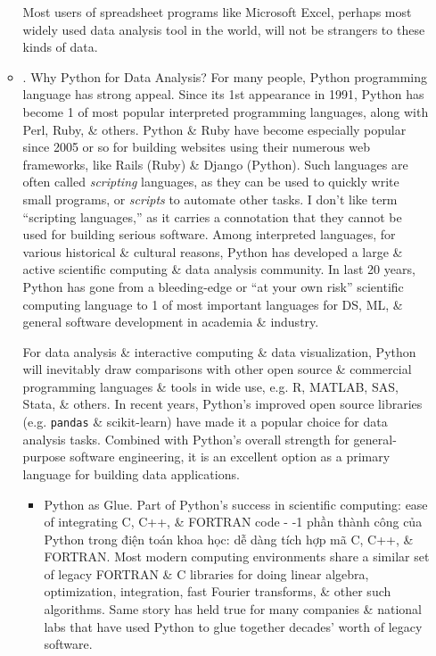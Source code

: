 \documentclass{article}
\begin{document}
\begin{itemize}
\begin{itemize}
		Most users of spreadsheet programs like Microsoft Excel, perhaps most widely used data analysis tool in the world, will not be strangers to these kinds of data.
		\item {. Why Python for Data Analysis?} For many people, Python programming language has strong appeal. Since its 1st appearance in 1991, Python has become 1 of most popular interpreted programming languages, along with Perl, Ruby, \& others. Python \& Ruby have become especially popular since 2005 or so for building websites using their numerous web frameworks, like Rails (Ruby) \& Django (Python). Such languages are often called {\it scripting} languages, as they can be used to quickly write small programs, or {\it scripts} to automate other tasks. I don't like term ``scripting languages,'' as it carries a connotation that they cannot be used for building serious software. Among interpreted languages, for various historical \& cultural reasons, Python has developed a large \& active scientific computing \& data analysis community. In last 20 years, Python has gone from a bleeding-edge or ``at your own risk'' scientific computing language to 1 of most important languages for DS, ML, \& general software development in academia \& industry.
		
		For data analysis \& interactive computing \& data visualization, Python will inevitably draw comparisons with other open source \& commercial programming languages \& tools in wide use, e.g. R, MATLAB, SAS, Stata, \& others. In recent years, Python's improved open source libraries (e.g. {\tt pandas} \& scikit-learn) have made it a popular choice for data analysis tasks. Combined with Python's overall strength for general-purpose software engineering, it is an excellent option as a primary language for building data applications.
		\begin{itemize}
			\item {\sf Python as Glue.} Part of Python's success in scientific computing: ease of integrating C, C++, \& FORTRAN code - -1 phần thành công của Python trong điện toán khoa học: dễ dàng tích hợp mã C, C++, \& FORTRAN. Most modern computing environments share a similar set of legacy FORTRAN \& C libraries for doing linear algebra, optimization, integration, fast Fourier transforms, \& other such algorithms. Same story has held true for many companies \& national labs that have used Python to glue together decades' worth of legacy software.
			

\end{itemize}
\end{itemize}
\end{itemize}
\end{document}
